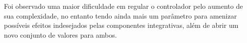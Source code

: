 Foi observado uma maior dificuldade em regular o controlador pelo aumento de sua complexidade,  no entanto tendo ainda mais
um parâmetro para amenizar possíveis efeitos indesejados pelas componentes integrativas, além de abrir um novo conjunto de 
valores para ambos.
